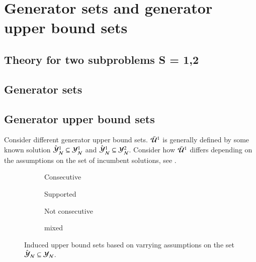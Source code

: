 \section{Generator sets and generator upper bound sets}

\subsection{Theory for two subproblems S = {1,2}}

\subsection{Generator sets}
	
\subsection{Generator upper bound sets}
Consider different generator upper bound sets. $\bar{\mathcal{U}}^{1}$ is generally defined by some known solution $\hat{\mathcal{Y}}_\mathcal{N}^1 \subseteq \mathcal{Y}_{\mathcal{N}}^1$ and  $\hat{\mathcal{Y}}_\mathcal{N}^1 \subseteq \mathcal{Y}_{\mathcal{N}}^2$. Consider how $\bar{\mathcal{U}}^{1}$ differs depending on the assumptions on the set of incumbent solutions, see .



\begin{figure}[ht!]
\centering
	\begin{subfigure}{0.47\textwidth}
		\centering
		\scalebox{1}{}
		\caption{Consecutive}
		\label{fig:ub_types-consecutive}
	\end{subfigure}
	\hfill
	\begin{subfigure}{0.47\textwidth}
		\centering
		\scalebox{1}{}
		\caption{Supported}
		\label{fig:ub_types-supported}
	\end{subfigure}
	\hfill
	\begin{subfigure}{0.47\textwidth}
		\centering
		\scalebox{1}{}
		\caption{Not consecutive}
		\label{fig:ub_types-nonconsecutive}
	\end{subfigure}
	\hfill
	\begin{subfigure}{0.47\textwidth}
		\centering
		\scalebox{1}{}
		\caption{mixed}
		\label{fig:ub_types-mixed}
	\end{subfigure}

	\label{fig:ub-types}
	\caption{Induced upper bound sets based on varrying assumptions on the set $\hat{\mathcal{Y}}_\mathcal{N} \subseteq \mathcal{Y}_{\mathcal{N}}$.}
\end{figure}

